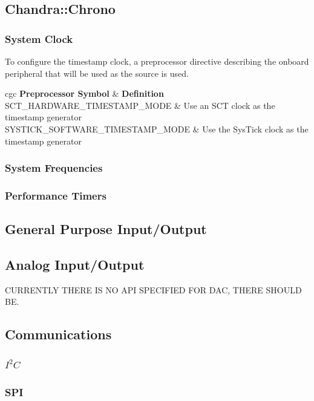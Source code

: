 \documentclass[10pt,letterpaper]{memoir} %
\newcommand{\iic}[0]{$I^{2}C$}
\begin{document}
\subsection{Chandra::Chrono}
\subsubsection{System Clock}
To configure the timestamp clock, a preprocessor directive describing the onboard peripheral that will be used as the source is used. \\
	\begin{centering}
	\begin{tabular}{cgc}
		\textbf{Preprocessor Symbol}  & \textbf{Definition}\\
		SCT\_HARDWARE\_TIMESTAMP\_MODE & Use an SCT clock as the timestamp generator\\
		SYSTICK\_SOFTWARE\_TIMESTAMP\_MODE & Use the SysTick clock as the timestamp generator\\
		
	\end{tabular}
	\end{centering}

\subsubsection{System Frequencies}
\subsubsection{Performance Timers}

\subsection{General Purpose Input/Output}
\subsection{Analog Input/Output}
CURRENTLY THERE IS NO API SPECIFIED FOR DAC, THERE SHOULD BE.

\subsection{Communications}
\subsubsection{\iic}
\subsubsection{SPI}
\end{document}

